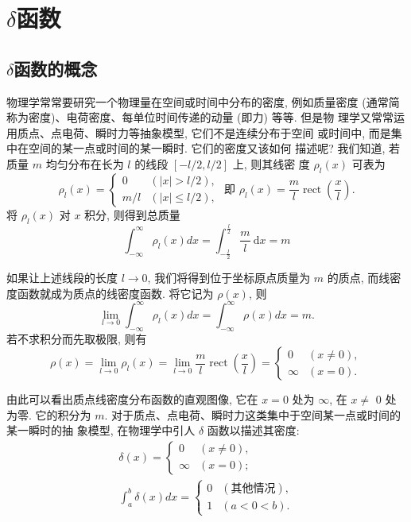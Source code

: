 \section{$\delta$函数}
\label{sub:delta_function}

\subsection{$\delta$函数的概念}

物理学常常要研究一个物理量在空间或时间中分布的密度, 例如质量密度 (通常简称为密度)、电荷密度、每单位时间传递的动量 (即力) 等等. 但是物 理学又常常运用质点、点电荷、瞬时力等抽象模型, 它们不是连续分布于空间 或时间中, 而是集中在空间的某一点或时间的某一瞬时. 它们的密度又该如何 描述呢?
我们知道, 若质量 $m$ 均匀分布在长为 $l$ 的线段 $[-l / 2, l / 2]$ 上, 则其线密 度 $\rho_l(x)$ 可表为
$$
\rho_l(x)=\left\{\begin{array}{ll}
0 & (|x|>l / 2), \\
m / l & (|x| \leqslant l / 2),
\end{array} \text { 即 } \rho_l(x)=\frac{m}{l} \operatorname{rect}\left(\frac{x}{l}\right) .\right.
$$
将 $\rho_l(x)$ 对 $x$ 积分, 则得到总质量
$$
\int_{-\infty}^{\infty} \rho_l(x) d x=\int_{-\frac{l}{2}}^{\frac{l}{2}} \frac{m}{l} \mathrm{~d} x=m
$$

如果让上述线段的长度 $l \rightarrow 0$, 我们将得到位于坐标原点质量为 $m$ 的质点, 而线密度函数就成为质点的线密度函数. 将它记为 $\rho(x)$, 则
$$
\lim _{l \rightarrow 0} \int_{-\infty}^{\infty} \rho_l(x) d x=\int_{-\infty}^{\infty} \rho(x) d x=m .
$$
若不求积分而先取极限, 则有
$$
\rho(x)=\lim _{l \rightarrow 0} \rho_l(x)=\lim _{l \rightarrow 0} \frac{m}{l} \operatorname{rect}\left(\frac{x}{l}\right)= \begin{cases}0 & (x \neq 0), \\ \infty & (x=0) .\end{cases}
$$

由此可以看出质点线密度分布函数的直观图像, 它在 $x=0$ 处为 $\infty$, 在 $x \neq$ 0 处为零. 它的积分为 $m$.
对于质点、点电荷、瞬时力这类集中于空间某一点或时间的某一瞬时的抽 象模型, 在物理学中引人 $\delta$ 函数以描述其密度:
$$
\begin{gathered}
\delta(x)= \begin{cases}0 & (x \neq 0), \\
\infty & (x=0) ;\end{cases} \\
\int_a^b \delta(x) d x= \begin{cases}0 & (\text{其他情况}), \\
1 & (a<0<b) .\end{cases}
\end{gathered}
$$
